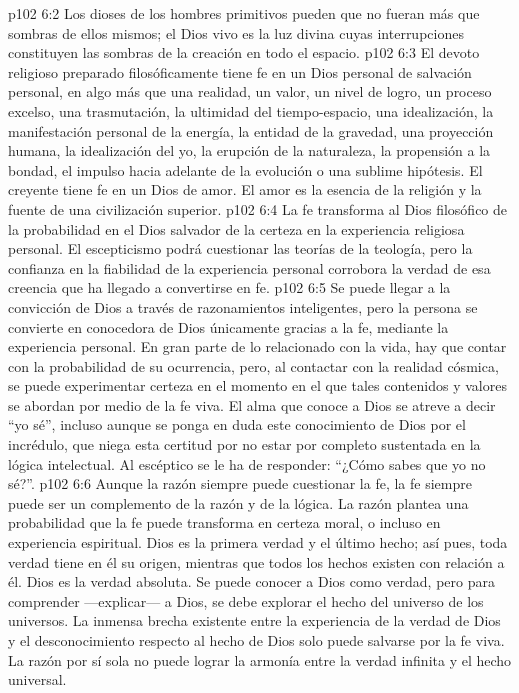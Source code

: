 \vs p102 6:2 Los dioses de los hombres primitivos pueden que no fueran más que sombras de ellos mismos; el Dios vivo es la luz divina cuyas interrupciones constituyen las sombras de la creación en todo el espacio.
\vs p102 6:3 \pc El devoto religioso preparado filosóficamente tiene fe en un Dios personal de salvación personal, en algo más que una realidad, un valor, un nivel de logro, un proceso excelso, una trasmutación, la ultimidad del tiempo\hyp{}espacio, una idealización, la manifestación personal de la energía, la entidad de la gravedad, una proyección humana, la idealización del yo, la erupción de la naturaleza, la propensión a la bondad, el impulso hacia adelante de la evolución o una sublime hipótesis. El creyente tiene fe en un Dios de amor. El amor es la esencia de la religión y la fuente de una civilización superior.
\vs p102 6:4 La fe transforma al Dios filosófico de la probabilidad en el Dios salvador de la certeza en la experiencia religiosa personal. El escepticismo podrá cuestionar las teorías de la teología, pero la confianza en la fiabilidad de la experiencia personal corrobora la verdad de esa creencia que ha llegado a convertirse en fe.
\vs p102 6:5 Se puede llegar a la convicción de Dios a través de razonamientos inteligentes, pero la persona se convierte en conocedora de Dios únicamente gracias a la fe, mediante la experiencia personal. En gran parte de lo relacionado con la vida, hay que contar con la probabilidad de su ocurrencia, pero, al contactar con la realidad cósmica, se puede experimentar certeza en el momento en el que tales contenidos y valores se abordan por medio de la fe viva. El alma que conoce a Dios se atreve a decir “yo sé”, incluso aunque se ponga en duda este conocimiento de Dios por el incrédulo, que niega esta certitud por no estar por completo sustentada en la lógica intelectual. Al escéptico se le ha de responder: “¿Cómo sabes que yo no sé?”.
\vs p102 6:6 \pc Aunque la razón siempre puede cuestionar la fe, la fe siempre puede ser un complemento de la razón y de la lógica. La razón plantea una probabilidad que la fe puede transforma en certeza moral, o incluso en experiencia espiritual. Dios es la primera verdad y el último hecho; así pues, toda verdad tiene en él su origen, mientras que todos los hechos existen con relación a él. Dios es la verdad absoluta. Se puede conocer a Dios como verdad, pero para comprender ---explicar--- a Dios, se debe explorar el hecho del universo de los universos. La inmensa brecha existente entre la experiencia de la verdad de Dios y el desconocimiento respecto al hecho de Dios solo puede salvarse por la fe viva. La razón por sí sola no puede lograr la armonía entre la verdad infinita y el hecho universal.
